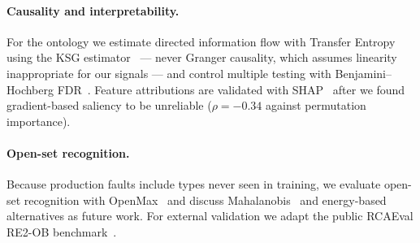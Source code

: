 \paragraph{Causality and interpretability.}
For the ontology we estimate directed information flow with Transfer Entropy using the KSG
estimator~\cite{kraskov2004} --- never Granger causality, which assumes linearity inappropriate
for our signals --- and control multiple testing with Benjamini--Hochberg FDR~\cite{benjamini1995}.
Feature attributions are validated with SHAP~\cite{lundberg2017} after we found gradient-based
saliency to be unreliable ($\rho=-0.34$ against permutation importance).

\paragraph{Open-set recognition.}
Because production faults include types never seen in training, we evaluate open-set recognition
with OpenMax~\cite{bendale2016openmax} and discuss Mahalanobis~\cite{lee2018mahalanobis} and
energy-based~\cite{liu2020energy} alternatives as future work. For external validation we adapt
the public RCAEval RE2-OB benchmark~\cite{rcaeval}.
